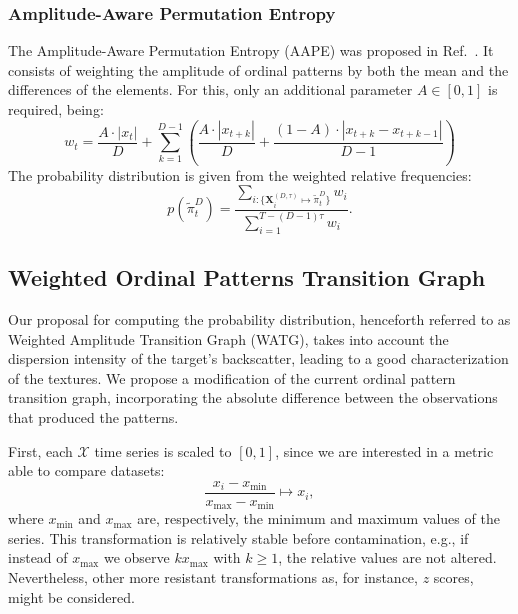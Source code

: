 \documentclass[journal]{IEEEtran}
\begin{document}
\subsubsection{Amplitude-Aware Permutation Entropy}\label{AAPE}

The Amplitude-Aware Permutation Entropy (AAPE) was proposed in Ref.~\cite{azami2016amplitude}.
It consists of weighting the amplitude of ordinal patterns by both the mean and the differences of the elements.
For this, only an additional parameter $ A \in [0, 1]$ is required, being:
\begin{equation}
w_t = \frac{A \cdot |x_t|}{D} + \sum_{k = 1}^{D - 1} \left(\frac{A \cdot |x_{t + k}|}{D} + \frac{(1 - A) \cdot |x_{t+k} - x_{t+k-1}|}{D - 1}\right)
\end{equation}
The probability distribution is given from the weighted relative frequencies:
\begin{equation}
p(\widetilde \pi_t^D) = \frac{\sum_{i : \{\mathbf{X}^{(D,\tau)}_i \mapsto \widetilde\pi^D_t\}} w_{i}}{\sum_{i = 1}^{T-(D-1)\tau} w_{i}}.
\end{equation}

\subsection{Weighted Ordinal Patterns Transition Graph}\label{WATG}

Our proposal for computing the probability distribution, henceforth referred to as Weighted Amplitude Transition Graph (WATG), takes into account the dispersion intensity of the target's backscatter, leading to a good characterization of the textures.
We propose a modification of the current ordinal pattern transition graph, incorporating the absolute difference between the observations that produced the patterns.

First, each $\mathcal{X}$ time series is scaled to $[0, 1]$, since we are interested in a metric able to compare datasets:
\begin{equation}
\frac{x_i - x_{\min}}{x_{\max} - x_{\min}} \longmapsto x_i,
\end{equation}
where $x_{\min}$ and $x_{\max}$ are, respectively, the minimum and maximum values of the series.
This transformation is relatively stable before contamination, e.g., if instead of $x_{\max}$ we observe $k x_{\max}$ with $k\geq 1$, the relative values are not altered. Nevertheless, other more resistant transformations as, for instance, $z$ scores, might be considered.
\end{document}
